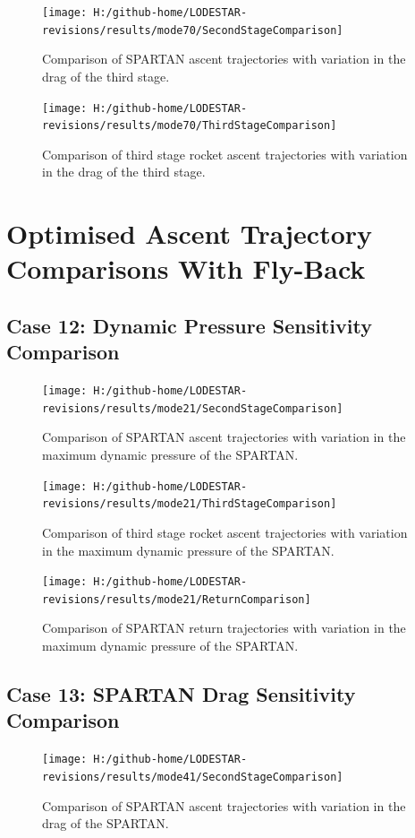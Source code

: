 \begin{figure}[!th]
\centering
\texttt{[image: H:/github-home/LODESTAR-revisions/results/mode70/SecondStageComparison]}
\caption{Comparison of SPARTAN ascent trajectories with variation in the drag of the third stage.}
\label{fig:SecondStageComparison8}
\end{figure}


\begin{figure}[!th]
\centering
\texttt{[image: H:/github-home/LODESTAR-revisions/results/mode70/ThirdStageComparison]}
\caption{Comparison of third stage rocket ascent trajectories with variation in the drag of the third stage.}
\label{fig:ThirdStageComparison8}
\end{figure}

\FloatBarrier
\clearpage
\section{Optimised Ascent Trajectory Comparisons With Fly-Back}
\FloatBarrier
\subsection{Case 12: Dynamic Pressure Sensitivity Comparison}\label{sec:app_comparison21}
\begin{figure}[!th]
\centering
\texttt{[image: H:/github-home/LODESTAR-revisions/results/mode21/SecondStageComparison]}
\caption{Comparison of SPARTAN ascent trajectories with variation in the maximum dynamic pressure of the SPARTAN.}
\label{fig:SecondStageComparison9}
\end{figure}

\begin{figure}[!th]
\centering
\texttt{[image: H:/github-home/LODESTAR-revisions/results/mode21/ThirdStageComparison]}
\caption{Comparison of third stage rocket ascent trajectories with variation in the maximum dynamic pressure of the SPARTAN.}
\label{fig:ThirdStageComparison9}
\end{figure}

\begin{figure}[!th]
\centering
\texttt{[image: H:/github-home/LODESTAR-revisions/results/mode21/ReturnComparison]}
\caption{Comparison of SPARTAN return trajectories with variation in the maximum dynamic pressure of the SPARTAN.}
\label{fig:ReturnComparison}
\end{figure}



\FloatBarrier
\clearpage
\subsection{Case 13: SPARTAN Drag Sensitivity Comparison}\label{sec:app_comparison41}
\begin{figure}[!th]
\centering
\texttt{[image: H:/github-home/LODESTAR-revisions/results/mode41/SecondStageComparison]}
\caption{Comparison of SPARTAN ascent trajectories with variation in the drag of the SPARTAN.}
\label{fig:SecondStageComparison11}
\end{figure}

